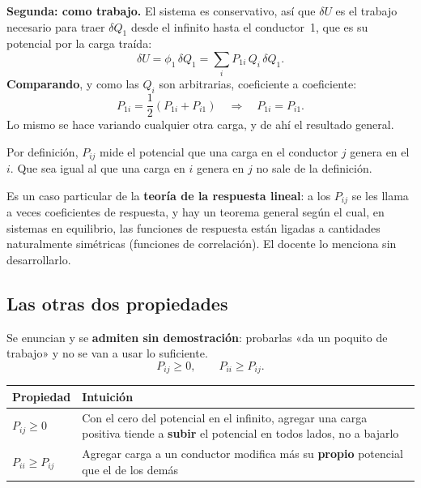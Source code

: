 \documentclass[12pt,a4paper]{article}
\begin{document}
\textbf{Segunda: como trabajo.} El sistema es conservativo, así que $\delta U$ es
el trabajo necesario para traer $\delta Q_1$ desde el infinito hasta el
conductor~1, que es su potencial por la carga traída:
\[
\delta U = \phi_1\,\delta Q_1 = \sum_i P_{1i}\,Q_i\,\delta Q_1 .
\]
\textbf{Comparando}, y como las $Q_i$ son arbitrarias, coeficiente a coeficiente:
\[
P_{1i} = \frac12\left(P_{1i}+P_{i1}\right)
\quad\Longrightarrow\quad
P_{1i} = P_{i1}.
\]
Lo mismo se hace variando cualquier otra carga, y de ahí el resultado general.

\begin{notebox}[No es obvio]
Por definición, $P_{ij}$ mide el potencial que una carga en el conductor $j$
genera en el $i$. Que sea igual al que una carga en $i$ genera en $j$ no sale de
la definición.
\end{notebox}

\begin{notebox}[Contexto]
Es un caso particular de la \textbf{teoría de la respuesta lineal}: a los
$P_{ij}$ se les llama a veces coeficientes de respuesta, y hay un teorema general
según el cual, en sistemas en equilibrio, las funciones de respuesta están
ligadas a cantidades naturalmente simétricas (funciones de correlación). El
docente lo menciona sin desarrollarlo.
\end{notebox}

\subsection{Las otras dos propiedades}

Se enuncian y se \textbf{admiten sin demostración}: probarlas «da un poquito de
trabajo» y no se van a usar lo suficiente.
\[
P_{ij} \ge 0,
\qquad
P_{ii} \ge P_{ij} .
\]

\begin{table}[H]
  \centering
  \begin{tabularx}{\textwidth}{lX}
    \toprule
    Propiedad & Intuición \\
    \midrule
    $P_{ij}\ge 0$ & Con el cero del potencial en el infinito, agregar una carga positiva tiende a \textbf{subir} el potencial en todos lados, no a bajarlo \\
    $P_{ii}\ge P_{ij}$ & Agregar carga a un conductor modifica más su \textbf{propio} potencial que el de los demás \\
    \bottomrule
  \end{tabularx}
\end{table}
\end{document}
